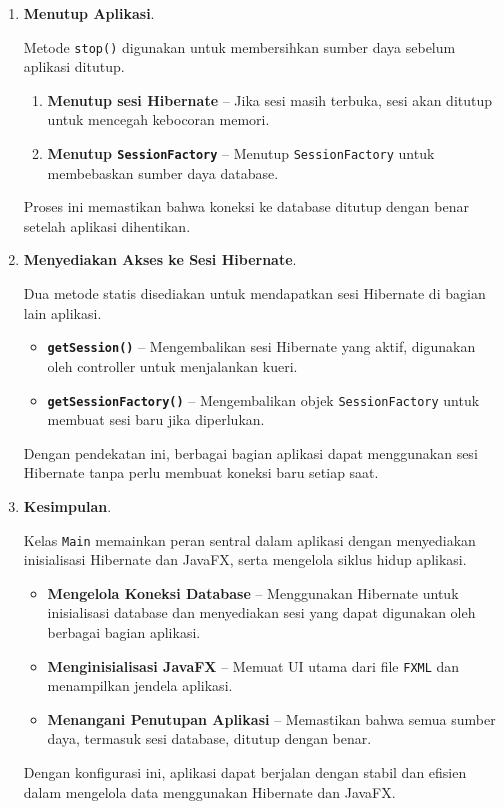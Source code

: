 \begin{enumerate}
	\item \textbf{Menutup Aplikasi}.
	
	Metode \texttt{stop()} digunakan untuk membersihkan sumber daya sebelum aplikasi ditutup.
	
	\begin{enumerate}
		\item \textbf{Menutup sesi Hibernate} – Jika sesi masih terbuka, sesi akan ditutup untuk mencegah kebocoran memori.
		\item \textbf{Menutup \texttt{SessionFactory}} – Menutup \texttt{SessionFactory} untuk membebaskan sumber daya database.
	\end{enumerate}
	
	Proses ini memastikan bahwa koneksi ke database ditutup dengan benar setelah aplikasi dihentikan.
	
	\item \textbf{Menyediakan Akses ke Sesi Hibernate}.
	
	Dua metode statis disediakan untuk mendapatkan sesi Hibernate di bagian lain aplikasi.
	
	\begin{itemize}
		\item \textbf{\texttt{getSession()}} – Mengembalikan sesi Hibernate yang aktif, digunakan oleh controller untuk menjalankan kueri.
		\item \textbf{\texttt{getSessionFactory()}} – Mengembalikan objek \texttt{SessionFactory} untuk membuat sesi baru jika diperlukan.
	\end{itemize}
	
	Dengan pendekatan ini, berbagai bagian aplikasi dapat menggunakan sesi Hibernate tanpa perlu membuat koneksi baru setiap saat.
	
	\item \textbf{Kesimpulan}.
	
	Kelas \texttt{Main} memainkan peran sentral dalam aplikasi dengan menyediakan inisialisasi Hibernate dan JavaFX, serta mengelola siklus hidup aplikasi.
	
	\begin{itemize}
		\item \textbf{Mengelola Koneksi Database} – Menggunakan Hibernate untuk inisialisasi database dan menyediakan sesi yang dapat digunakan oleh berbagai bagian aplikasi.
		\item \textbf{Menginisialisasi JavaFX} – Memuat UI utama dari file \texttt{FXML} dan menampilkan jendela aplikasi.
		\item \textbf{Menangani Penutupan Aplikasi} – Memastikan bahwa semua sumber daya, termasuk sesi database, ditutup dengan benar.
	\end{itemize}
	
	Dengan konfigurasi ini, aplikasi dapat berjalan dengan stabil dan efisien dalam mengelola data menggunakan Hibernate dan JavaFX.
\end{enumerate}


